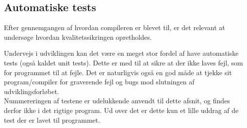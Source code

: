 \subsection{Automatiske tests}
Efter gennemgangen af hvordan compileren er blevet til, er det relevant at undersøge hvordan kvalitetssikringen opretholdes.

\noindent Undervejs i udviklingen kan det være en meget stor fordel af have automatiske tests (også kaldet unit tests). Dette er med til at sikre at der ikke laves fejl, som for programmet til at fejle. Det er naturligvis også en god måde at tjekke sit program/compiler for graverende fejl og bugs mod slutningen af udviklingsforløbet.\\

\noindent Nummereringen af testene er udelukkende anvendt til dette afsnit, og findes derfor ikke i det rigtige program. Ud over det er dette kun et lille uddrag af de test der er lavet til programmet.
